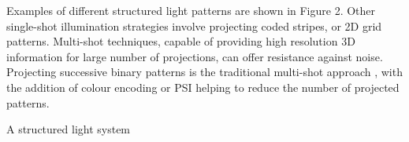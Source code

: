 \documentclass[class=article, crop=false]{standalone}
\begin{document}
\par
Examples of different structured light patterns are shown in Figure 2. Other single-shot illumination strategies involve projecting coded stripes, or 2D grid patterns. Multi-shot techniques, capable of providing high resolution 3D information for large number of projections, can offer resistance against noise. Projecting successive binary patterns is the traditional multi-shot approach \parencite{Posdamer1982}, with the addition of colour encoding \parencite{Caspi1998} or PSI \parencite{Huang2006} helping to reduce the number of projected patterns.
\par
A structured light system 



	
\end{document}
